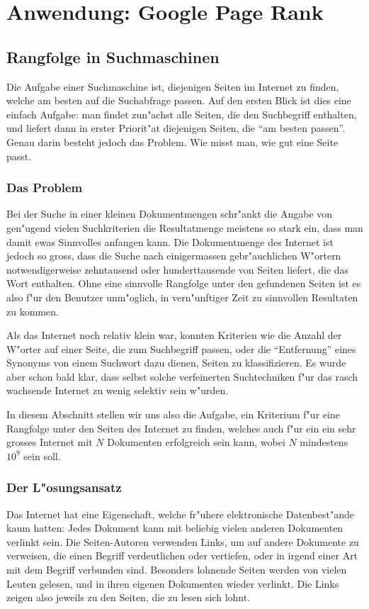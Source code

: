 %
%
%
\section{Anwendung: Google Page Rank} \label{pagerank}

\subsection{Rangfolge in Suchmaschinen}
Die Aufgabe einer Suchmaschine ist, diejenigen Seiten im Internet zu
finden, welche am besten auf die Suchabfrage passen.
Auf den ersten
Blick ist dies eine einfach Aufgabe: man findet zun"achst alle Seiten,
die den Suchbegriff enthalten, und liefert dann in erster Priorit"at
diejenigen Seiten, die ``am besten passen''.
Genau darin besteht jedoch
das Problem.
Wie misst man, wie gut eine Seite passt.

\subsubsection{Das Problem}
Bei der Suche in einer kleinen Dokumentmengen schr"ankt die Angabe von
gen"ugend vielen Suchkriterien die Resultatmenge meistens so stark
ein, dass man damit ewas Sinnvolles anfangen kann.
Die Dokumentmenge
des Internet ist jedoch so gross, dass die Suche nach einigermassen
gebr"auchlichen W"ortern notwendigerweise zehntausend oder hunderttausende
von Seiten liefert, die das Wort enthalten.
Ohne eine sinnvolle Rangfolge
unter den gefundenen Seiten ist es also f"ur den Benutzer unm"oglich, in
vern"unftiger Zeit zu sinnvollen Resultaten zu kommen.

Als das Internet noch relativ klein war, konnten Kriterien wie die
Anzahl der W"orter auf einer Seite, die zum Suchbegriff passen,
oder die ``Entfernung'' eines Synonyms von einem Suchwort dazu dienen,
Seiten zu klassifizieren.
Es wurde aber schon bald klar, dass selbst
solche verfeinerten Suchtechniken f"ur das rasch wachsende Internet
zu wenig selektiv sein w"urden.

In diesem Abschnitt stellen wir uns also die Aufgabe, ein Kriterium
f"ur eine Rangfolge unter den Seiten des Internet zu finden, welches auch
f"ur ein ein sehr grosses Internet mit $N$ Dokumenten erfolgreich sein kann,
wobei $N$ mindestens $10^9$ sein soll.

\subsubsection{Der L"osungsansatz}
Das Internet hat eine Eigenschaft, welche fr"uhere elektronische 
Datenbest"ande kaum hatten: Jedes Dokument kann mit beliebig vielen anderen
Dokumenten verlinkt sein.
Die Seiten-Autoren verwenden Links, um auf
andere Dokumente zu verweisen, die einen Begriff verdeutlichen oder
vertiefen, oder in irgend einer Art mit dem Begriff verbunden sind.
Besonders lohnende Seiten werden von vielen Leuten gelesen, und in ihren
eigenen Dokumenten wieder verlinkt.
Die Links zeigen also jeweils zu den
Seiten, die zu lesen sich lohnt.

